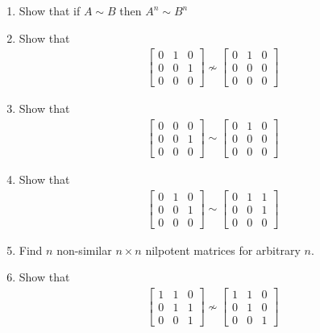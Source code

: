 \documentclass{amsart}
\begin{document}
	
	\begin{enumerate}
		\item Show that if $A \sim B$ then $A^n \sim B^n$
		\item Show that 
		\begin{align*}
			\begin{bmatrix}
					0 & 1 & 0 \\
					0 & 0 & 1 \\
					0 & 0 & 0
			\end{bmatrix}
			\nsim 
			\begin{bmatrix}
					0 & 1 & 0 \\
					0 & 0 & 0 \\
					0 & 0 & 0
			\end{bmatrix}
		\end{align*}
		\item Show that 
		\begin{align*}
			\begin{bmatrix}
					0 & 0 & 0 \\
					0 & 0 & 1 \\
					0 & 0 & 0
			\end{bmatrix}
			\sim 
			\begin{bmatrix}
					0 & 1 & 0 \\
					0 & 0 & 0 \\
					0 & 0 & 0
			\end{bmatrix}
		\end{align*}		
		\item Show that 
		\begin{align*}
			\begin{bmatrix}
					0 & 1 & 0 \\
					0 & 0 & 1 \\
					0 & 0 & 0
			\end{bmatrix}
			\sim 
			\begin{bmatrix}
					0 & 1 & 1 \\
					0 & 0 & 1 \\
					0 & 0 & 0
			\end{bmatrix}
		\end{align*}
		\item Find $n$ non-similar $n\times n$ nilpotent matrices for arbitrary $n$.
		\item Show that 
		\begin{align*}
			\begin{bmatrix}
					1 & 1 & 0 \\
					0 & 1 & 1 \\
					0 & 0 & 1
			\end{bmatrix}
			\nsim 
			\begin{bmatrix}
					1 & 1 & 0 \\
					0 & 1 & 0 \\
					0 & 0 & 1
			\end{bmatrix}
		\end{align*}
	\end{enumerate}
\end{document}
